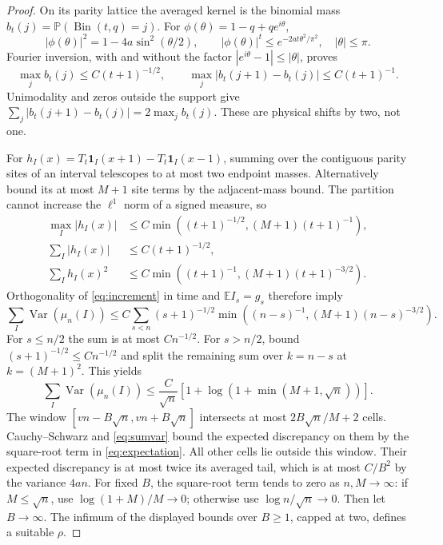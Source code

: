 \documentclass[11pt]{article}
\newcommand{\EE}{\mathbb E}
\newcommand{\PP}{\mathbb P}
\newcommand{\one}{\mathbf 1}
\DeclareMathOperator{\Var}{Var}
\begin{document}
\begin{proof}
On its parity lattice the averaged kernel is the binomial mass
$b_t(j)=\PP(\operatorname{Bin}(t,q)=j)$.
For $\phi(\theta)=1-q+qe^{i\theta}$,
\[
 |\phi(\theta)|^2=1-4a\sin^2(\theta/2),\qquad
 |\phi(\theta)|^t\leq e^{-2at\theta^2/\pi^2},
                  \quad |\theta|\leq\pi.
\]
Fourier inversion, with and without the factor
$|e^{i\theta}-1|\leq|\theta|$, proves
\[
 \max_j b_t(j)\leq C(t+1)^{-1/2},\qquad
 \max_j|b_t(j+1)-b_t(j)|\leq C(t+1)^{-1}.
\]
Unimodality and zeros outside the support give
$\sum_j|b_t(j+1)-b_t(j)|=2\max_j b_t(j)$.
These are physical shifts by two, not one.

For $h_I(x)=T_t\one_I(x+1)-T_t\one_I(x-1)$, summing over the
contiguous parity sites of an interval telescopes to at most two
endpoint masses. Alternatively bound its at most $M+1$ site terms
by the adjacent-mass bound. The partition cannot increase the
$\ell^1$ norm of a signed measure, so
\begin{align*}
 \max_I|h_I(x)|
     &\leq C\min((t+1)^{-1/2},(M+1)(t+1)^{-1}),\\
 \sum_I|h_I(x)|&\leq C(t+1)^{-1/2},\\
 \sum_I h_I(x)^2
     &\leq C\min((t+1)^{-1},(M+1)(t+1)^{-3/2}).
\end{align*}
Orthogonality of \eqref{eq:increment} in time and
$\EE I_s=g_s$ therefore imply
\[
 \sum_I\Var(\mu_n(I))
  \leq C\sum_{s<n}(s+1)^{-1/2}
       \min((n-s)^{-1},(M+1)(n-s)^{-3/2}).
\]
For $s\leq n/2$ the sum is at most $Cn^{-1/2}$.
For $s>n/2$, bound $(s+1)^{-1/2}\leq Cn^{-1/2}$ and split the
remaining sum over $k=n-s$ at $k=(M+1)^2$.
This yields
\begin{equation}\label{eq:sumvar}
 \sum_I\Var(\mu_n(I))
       \leq\frac C{\sqrt n}
                 [1+\log(1+\min(M+1,\sqrt n))].
\end{equation}
The window $[vn-B\sqrt n,vn+B\sqrt n]$ intersects at most
$2B\sqrt n/M+2$ cells. Cauchy--Schwarz and \eqref{eq:sumvar}
bound the expected discrepancy on them by the square-root term
in \eqref{eq:expectation}. All other cells lie outside this window.
Their expected discrepancy is at most twice its averaged tail,
which is at most $C/B^2$ by the variance $4an$.
For fixed $B$, the square-root term tends to zero as $n,M\to\infty$:
if $M\leq\sqrt n$, use $\log(1+M)/M\to0$; otherwise use
$\log n/\sqrt n\to0$. Then let $B\to\infty$.
The infimum of the displayed bounds over $B\geq1$, capped at two,
defines a suitable $\rho$.
\end{proof}
\end{document}
